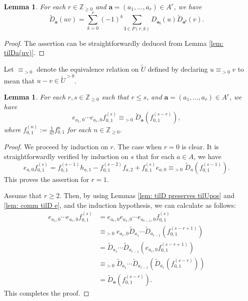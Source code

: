 \documentclass[12pt,a4paper]{amsart}
\newtheorem{lem}[thm]{Lemma}
\theoremstyle{definition}
\numberwithin{equation}{subsection}
\begin{document}
\begin{lem}
  For each $r \in \mathbb{Z}_{\geq 0}$ and $\mathbf{a} = (a_1,\dots,a_r) \in A^r$, we have
  \[
    \tilde{D}_{\mathbf{a}}(uv) = \sum_{k=0}^r (-1)^k \sum_{\mathbf{l} \in P(r,k)} D_{\mathbf{a}_\mathbf{l}}(u) \tilde{D}_{\mathbf{a}^\mathbf{l}}(v).
  \]
\end{lem}
\begin{proof}
  The assertion can be straightforwardly deduced from Lemma \ref{lem: tilDa(uv)}.
\end{proof}

Let $\equiv_{> 0}$ denote the equivalence relation on $\tilde{U}$ defined by declaring $u \equiv_{>0} v$ to mean that $u-v \in \tilde{U}^{> 0}$.

\begin{lem}\label{lem: er fs}
  For each $r,s \in \mathbb{Z}_{\geq 0}$ such that $r \leq s$, and $\mathbf{a} = (a_1,\dots,a_r) \in A^r$, we have
  \[
    e_{a_1,0} \cdots e_{a_r,0} f_{0,1}^{(s)} \equiv_{>0} \tilde{D}_\mathbf{a}(f_{0,1}^{(s-r)}),
  \]
  where $f_{0,1}^{(n)} := \frac{1}{n!} f_{0,1}^n$ for each $n \in \mathbb{Z}_{\geq 0}$.
\end{lem}
\begin{proof}
  We proceed by induction on $r$.
  The case when $r = 0$ is clear.
  It is straightforwardly verified by induction on $s$ that for each $a \in A$, we have
  \[
    e_{a,0} f_{0,1}^{(s)} = f_{0,1}^{(s-1)} h_{a,1} - f_{0,1}^{(s-2)} f_{a,2} + f_{0,1}^{(s)} e_{a,0} \equiv_{>0} \tilde{D}_{a}(f_{0,1}^{(s-1)}).
  \]
  This proves the assertion for $r = 1$.

  Assume that $r \geq 2$.
  Then, by using Lemmas \ref{lem: tilD preserves tilUpos} and \ref{lem: comm tilD e}, and the induction hypothesis, we can calculate as follows:
  \begin{align*}
    e_{a_1,0} \cdots e_{a_r,0} f_{0,1}^{(s)}
    &= e_{a_r,0} e_{a_1,0} \cdots e_{a_{r-1},0} f_{0,1}^{(s)}\\
    &\equiv_{>0} e_{a_r,0} \tilde{D}_{a_1} \cdots \tilde{D}_{a_{r-1}}(f_{0,1}^{(s-r+1)})\\
    &= \tilde{D}_{a_1} \cdots \tilde{D}_{a_{r-1}}(e_{a_r,0} f_{0,1}^{(s-r+1)})\\
    &\equiv_{>0} \tilde{D}_{a_1} \cdots \tilde{D}_{a_{r-1}}(\tilde{D}_{a_r}(f_{0,1}^{(s-r)}))\\
    &= \tilde{D}_{\mathbf{a}}(f_{0,1}^{(s-r)}).
  \end{align*}
  This completes the proof.
\end{proof}
\end{document}
